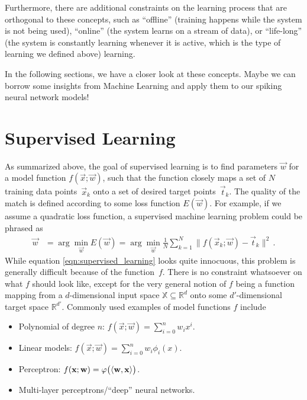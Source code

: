 \documentclass[10pt,letterpaper,oneside]{article}
\begin{document}
Furthermore, there are additional constraints on the learning process that are orthogonal to these concepts, such as \enquote{offline} (training happens while the system is not being used), \enquote{online} (the system learns on a stream of data), or \enquote{life-long} (the system is constantly learning whenever it is active, which is the type of learning we defined above) learning.

In the following sections, we have a closer look at these concepts. Maybe we can borrow some insights from Machine Learning and apply them to our spiking neural network models!

\section{Supervised Learning}

As summarized above, the goal of supervised learning is to find parameters $\vec w$ for a model function $f(\vec x; \vec w)$, such that the function closely maps a set of $N$ training data points~$\vec x_k$ onto a set of desired target points~$\vec t_k$. The quality of the match is defined according to some loss function $E(\vec w)$. For example, if we assume a quadratic loss function, a supervised machine learning problem could be phrased as
\begin{align}
	\vec w &= \arg \min_{\vec w} E(\vec w) = \arg \min_{\vec w} \frac{1}{N} \sum_{k = 1}^N \big\| f(\vec x_k ; \vec w) - \vec t_k \big\|^2 \,.
	\label{eqn:supervised_learning}
\end{align}
While equation \cref{eqn:supervised_learning} looks quite innocuous, this problem is generally difficult because of the function~$f$. There is no constraint whatsoever on what $f$ should look like, except for the very general notion of $f$ being a function mapping from a $d$-dimensional input space $\mathbb{X} \subseteq \mathbb{R}^d$ onto some $d'$-dimensional target space $\mathbb{R}^{d'}$. Commonly used examples of model functions $f$ include
\begin{itemize}
	\item Polynomial of degree $n$: $f(\vec x; \vec w) = \sum_{i = 0}^n w_i x^i$.
	\item Linear models: $f(\vec x; \vec w) = \sum_{i = 0}^n w_i \phi_i(x)$.
	\item Perceptron: $f({\mathbf{x}}; {\mathbf{w}}) = \varphi\big(\langle {\mathbf{w}}, {\mathbf{x}} \rangle \big)$.
	\item Multi-layer perceptrons/\enquote{deep} neural networks.
\end{itemize}
\end{document}
